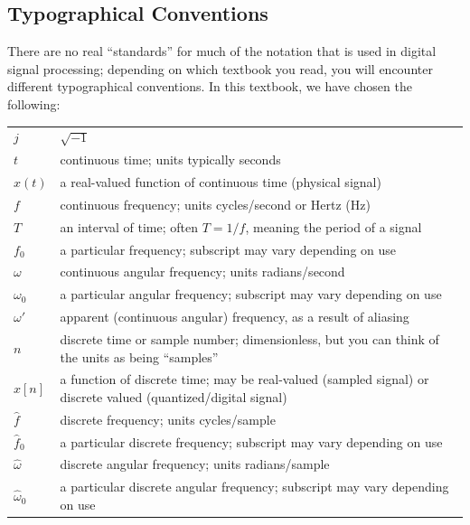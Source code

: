 \subsection*{Typographical Conventions}

There are no real ``standards'' for much of the notation that is used
in digital signal processing; depending on which textbook you read,
you will encounter different typographical conventions. In this
textbook, we have chosen the following:
\begin{center}
\begin{tabular}{lp{5in}}
  $j$    & $\sqrt{-1}$ \\
  $t$    & continuous time; units typically seconds \\
  $x(t)$ & a real-valued function of continuous time (physical signal) \\
  $f$    & continuous frequency; units cycles/second or Hertz (Hz) \\
  $T$    & an interval of time; often $T=1/f$, meaning the period of a
           signal \\
  $f_0$  & a particular frequency; subscript may vary depending on use \\
  $\omega$ & continuous angular frequency; units radians/second \\
  $\omega_0$ & a particular angular frequency; subscript may vary
               depending on use \\
  $\omega'$ & apparent (continuous angular) frequency, as a result of
                        aliasing \\
  $n$    & discrete time or sample number; dimensionless, but you can
           think of the units as being ``samples'' \\
  $x[n]$ & a function of discrete time; may be real-valued (sampled
           signal) or discrete valued (quantized/digital signal) \\
  $\hat{f}$ & discrete frequency; units cycles/sample \\
  $\hat{f}_0$  & a particular discrete frequency; subscript may vary
                 depending on use \\
  $\hat{\omega}$ & discrete angular frequency; units radians/sample \\
  $\hat{\omega}_0$ & a particular discrete angular frequency; subscript may vary
               depending on use \\
\end{tabular}
\end{center}

